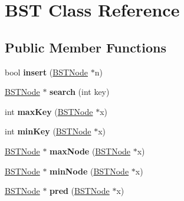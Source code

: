 \hypertarget{class_b_s_t}{\section{\-B\-S\-T \-Class \-Reference}
\label{class_b_s_t}
}
\subsection*{\-Public \-Member \-Functions}
\begin{DoxyCompactItemize}
\item 
\hypertarget{class_b_s_t_ae8acca861d2f0ad1d229d43947d0b749}{bool {\bfseries insert} (\hyperlink{struct_b_s_t_node}{\-B\-S\-T\-Node} $\ast$n)}\label{class_b_s_t_ae8acca861d2f0ad1d229d43947d0b749}

\item 
\hypertarget{class_b_s_t_aba05f9ba8654d2624ae2ef4e662a9766}{\hyperlink{struct_b_s_t_node}{\-B\-S\-T\-Node} $\ast$ {\bfseries search} (int key)}\label{class_b_s_t_aba05f9ba8654d2624ae2ef4e662a9766}

\item 
\hypertarget{class_b_s_t_ae202db0524b35f4367c62752d320d86c}{int {\bfseries max\-Key} (\hyperlink{struct_b_s_t_node}{\-B\-S\-T\-Node} $\ast$x)}\label{class_b_s_t_ae202db0524b35f4367c62752d320d86c}

\item 
\hypertarget{class_b_s_t_a0c985f1061276bbe68bbd90cfccc95e7}{int {\bfseries min\-Key} (\hyperlink{struct_b_s_t_node}{\-B\-S\-T\-Node} $\ast$x)}\label{class_b_s_t_a0c985f1061276bbe68bbd90cfccc95e7}

\item 
\hypertarget{class_b_s_t_ac0157f4979c9155ac3b4c3b587c7dee1}{\hyperlink{struct_b_s_t_node}{\-B\-S\-T\-Node} $\ast$ {\bfseries max\-Node} (\hyperlink{struct_b_s_t_node}{\-B\-S\-T\-Node} $\ast$x)}\label{class_b_s_t_ac0157f4979c9155ac3b4c3b587c7dee1}

\item 
\hypertarget{class_b_s_t_ab5762f838dbafc126c38103f98b0686f}{\hyperlink{struct_b_s_t_node}{\-B\-S\-T\-Node} $\ast$ {\bfseries min\-Node} (\hyperlink{struct_b_s_t_node}{\-B\-S\-T\-Node} $\ast$x)}\label{class_b_s_t_ab5762f838dbafc126c38103f98b0686f}

\item 
\hypertarget{class_b_s_t_a20c8a193c172122ec2a8edcaba380f7b}{\hyperlink{struct_b_s_t_node}{\-B\-S\-T\-Node} $\ast$ {\bfseries pred} (\hyperlink{struct_b_s_t_node}{\-B\-S\-T\-Node} $\ast$x)}\label{class_b_s_t_a20c8a193c172122ec2a8edcaba380f7b}


\end{DoxyCompactItemize}
